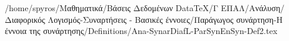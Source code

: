 /home/spyros/Μαθηματικά/Βάσεις Δεδομένων DataTeX/Γ ΕΠΑΛ/Ανάλυση/Διαφορικός Λογισμός-Συναρτήσεις - Βασικές έννοιες/Παράγωγος συνάρτηση-Η έννοια της συνάρτησης/Definitions/Ana-SynarDiafL-ParSynEnSyn-Def2.tex